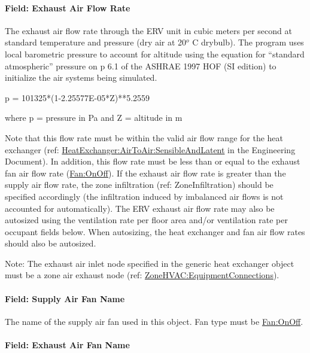 \paragraph{Field: Exhaust Air Flow Rate}\label{field-exhaust-air-flow-rate-1}

The exhaust air flow rate through the ERV unit in cubic meters per second at standard temperature and pressure (dry air at 20\(^{o}\) C drybulb). The program uses local barometric pressure to account for altitude using the equation for ``standard atmospheric'' pressure on p 6.1 of the ASHRAE 1997 HOF (SI edition) to initialize the air systems being simulated.

p = 101325*(1-2.25577E-05*Z)**5.2559

where p = pressure in Pa and Z = altitude in m

Note that this flow rate must be within the valid air flow range for the heat exchanger (ref: \hyperref[heatexchangerairtoairsensibleandlatent]{HeatExchanger:AirToAir:SensibleAndLatent} in the Engineering Document). In addition, this flow rate must be less than or equal to the exhaust fan air flow rate (\hyperref[fanonoff]{Fan:OnOff}). If the exhaust air flow rate is greater than the supply air flow rate, the zone infiltration (ref: ZoneInfiltration) should be specified accordingly (the infiltration induced by imbalanced air flows is not accounted for automatically). The ERV exhaust air flow rate may also be autosized using the ventilation rate per floor area and/or ventilation rate per occupant fields below. When autosizing, the heat exchanger and fan air flow rates should also be autosized.

Note: The exhaust air inlet node specified in the generic heat exchanger object must be a zone air exhaust node (ref: \hyperref[zonehvacequipmentconnections]{ZoneHVAC:EquipmentConnections}).

\paragraph{Field: Supply Air Fan Name}\label{field-supply-air-fan-name-7}

The name of the supply air fan used in this object. Fan type must be \hyperref[fanonoff]{Fan:OnOff}.

\paragraph{Field: Exhaust Air Fan Name}\label{field-exhaust-air-fan-name}

